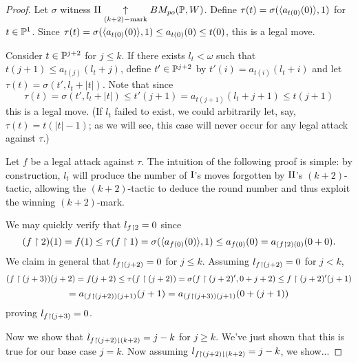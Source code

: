 \documentclass[11pt]{article}
\theoremstyle{plain}
\theoremstyle{definition}
\theoremstyle{remark}
\theoremstyle{plain}
\theoremstyle{definition}
\theoremstyle{remark}
\newcommand{\bmPoGame}[2]{BM_{po}(#1,#2)}
\begin{document}
  \begin{proof}
    Let \(\sigma\) witness \(\plII\kmarkwin{(k+2)}\bmPoGame{\mb P}{W}\).
    Define \(\tau(t)=\sigma(\langle a_{t(0)}(0)\rangle,1)\) for \(t\in\mathbb{P}^1\).
    Since \(\tau(t)=\sigma(\langle a_{t(0)}(0)\rangle,1)\leq a_{t(0)}(0)\leq t(0)\),
    this is a legal move.

    Consider \(t\in\mathbb{P}^{j+2}\) for \(j\leq k\).
    If there exists \(l_t<\omega\) such that
    \(t(j+1)\leq a_{t(j)}(l_t+j)\),
    define \(t'\in\mathbb{P}^{j+2}\) by \(t'(i)=a_{t(i)}(l_t+i)\) and let
    \(\tau(t)=\sigma(t',l_t+|t|)\). Note that since
    \[
      \tau(t)
        =
      \sigma(t',l_t+|t|)
        \leq
      t'(j+1)
        =
      a_{t(j+1)}(l_t+j+1)
        \leq
      t(j+1)
    \]
    this is a legal move. (If \(l_t\) failed to exist,
    we could arbitrarily let, say,
    \(\tau(t)=t(|t|-1)\); as we will see, this case will never occur
    for any legal attack against \(\tau\).)

    Let \(f\) be a legal attack against \(\tau\). The intuition of the
    following proof is simple: by construction, \(l_t\) will produce
    the number of \(\mathrm{I}\)'s moves forgotten by \(\mathrm{II}\)'s \((k+2)\)-tactic,
    allowing the \((k+2)\)-tactic to deduce the round number and thus exploit
    the winning \((k+2)\)-mark.

    We may quickly verify
    that \(l_{f\restriction 2}=0\) since
    \[
      (f\restriction 2)(1)
        =
      f(1)
        \leq
      \tau(f\restriction 1)
        =
      \sigma(\langle a_{f(0)}(0)\rangle,1)
        \leq
      a_{f(0)}(0)
        =
      a_{(f\restriction 2)(0)}(0+0)
    .\]
    We claim in general that \(l_{f\restriction(j+2)}=0\) for \(j\leq k\).
    Assuming \(l_{f\restriction(j+2)}=0\) for \(j<k\),
    \[
      (f\restriction(j+3))(j+2)
        =
      f(j+2)
        \leq
      \tau(f\restriction(j+2))
        =
      \sigma(f\restriction(j+2)',0+j+2)
        \leq
      f\restriction(j+2)'(j+1)
    \]
    \[
        =
      a_{(f\restriction(j+2))(j+1)}(j+1)
        =
      a_{(f\restriction(j+3))(j+1)}(0+(j+1))
    \]
    proving \(l_{f\restriction(j+3)}=0\).

    Now we show that \(l_{f\restriction(j+2)\downharpoonright(k+2)}=j-k\) for \(j\geq k\).
    We've just shown that this is true for our base case \(j=k\).
    Now assuming \(l_{f\restriction(j+2)\downharpoonright(k+2)}=j-k\), we show...
  \end{proof}

  
  
\end{document}
